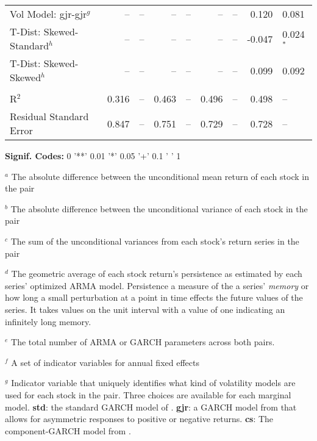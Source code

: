 \documentclass[12pt]{report}
\begin{document}
\begin{table}
\begin{tabular}{l r l r l r l r l}
        Vol Model: gjr-gjr$^{g}$           &      -- & --           &      -- & --           &      -- & --           &   0.120 & 0.081         \\
        T-Dist: Skewed-Standard$^{h}$      &      -- & --           &      -- & --           &      -- & --           &  -0.047 & 0.024$^{*}$   \\
        T-Dist: Skewed-Skewed$^{h}$        &      -- & --           &      -- & --           &      -- & --           &   0.099 & 0.092         \\  \\
        R$^{2}$                            &   0.316 & --           &   0.463 & --           &   0.496 & --           &   0.498 & --            \\
        Residual Standard Error            &   0.847 & --           &   0.751 & --           &   0.729 & --           &   0.728 & --            \\
        \midrule
    \end{tabular}
    \begin{tablenotes}
        \item{\footnotesize \textbf{Signif. Codes:} 0 '**' 0.01 '*' 0.05 '+' 0.1 ' ' 1}
        \item {$^{a}$ The absolute difference between the unconditional mean return of each stock in the pair}
        \item {$^{b}$ The absolute difference between the unconditional variance of each stock in the pair}
        \item {$^{c}$ The sum of the unconditional variances from each stock's return series in the pair}
        \item {$^{d}$ The geometric average of each stock return's persistence as estimated by each series' optimized ARMA model. Persistence a measure of the a series' \textit{memory} or how long a small perturbation at a point in time effects the future values of the series. It takes values on the unit interval with a value of one indicating an infinitely long memory.}
        \item {$^{e}$ The total number of ARMA or GARCH parameters across both pairs.}
        \item {$^{f}$ A set of indicator variables for annual fixed effects}
        \item {$^{g}$ Indicator variable that uniquely identifies what kind of volatility models are used for each stock in the pair. Three choices are available for each marginal model. \textbf{std}: the standard GARCH model of \cite{Bollerslev1986Garch}. \textbf{gjr}: a GARCH model from \cite{GJR1993Garch} that allows for asymmetric responses to positive or negative returns. \textbf{cs}: The component-GARCH model from \cite{EngleLee1993APA}.}

\end{tablenotes}
\end{table}
\end{document}
